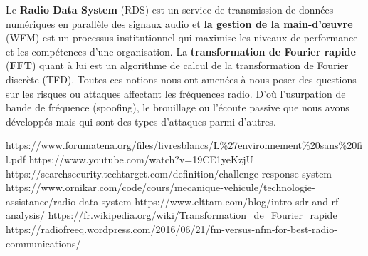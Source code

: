 \documentclass[a4paper]{article}
\begin{document}
Le \textbf{Radio Data System} (RDS) est un service de transmission de données numériques en parallèle des signaux audio et \textbf{la gestion de la main-d'œuvre} (WFM) est un processus institutionnel qui maximise les niveaux de performance et les compétences d'une organisation. La \textbf{transformation de Fourier rapide} (\textbf{FFT}) quant à lui est un algorithme de calcul de la transformation de Fourier discrète (TFD). Toutes ces notions nous ont amenées à nous poser des questions sur les risques ou attaques affectant les fréquences radio. D’où l’usurpation de bande de fréquence (spoofing), le brouillage ou l’écoute passive que nous avons développés mais qui sont des types d’attaques parmi d’autres.














\newpage \tableofcontents \listoffigures
\begin{thebibliography}{9}
 https://www.forumatena.org/files/livresblancs/L\%27environnement\%20sans\%20fil.pdf
 https://www.youtube.com/watch?v=19CE1yeKzjU
 https://searchsecurity.techtarget.com/definition/challenge-response-system
 https://www.ornikar.com/code/cours/mecanique-vehicule/technologie-assistance/radio-data-system
 https://www.elttam.com/blog/intro-sdr-and-rf-analysis/
 https://fr.wikipedia.org/wiki/Transformation\_de\_Fourier\_rapide
 https://radiofreeq.wordpress.com/2016/06/21/fm-versus-nfm-for-best-radio-communications/
\end{thebibliography}
\end{document}
